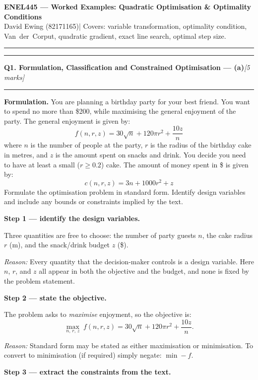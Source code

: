 \documentclass[10pt,a4paper]{article}
\newcommand{\sectitle}[2]{%
  \vspace{10pt}\noindent\rule{\linewidth}{0.8pt}\par\vspace{2pt}%
  {\large\textbf{#1}\hfill\normalsize\textit{[#2 marks]}}\par
  \vspace{2pt}\rule{\linewidth}{0.4pt}\vspace{4pt}}
\newcommand{\reason}[1]{%
  \begin{mdframed}[backgroundcolor=reasonbg, linewidth=0.4pt,
    innertopmargin=3pt, innerbottommargin=3pt,
    innerleftmargin=6pt, innerrightmargin=6pt]
    \small\textit{Reason:} \small #1
  \end{mdframed}\vspace{2pt}}
\begin{document}
\begin{center}
  {\large\textbf{ENEL445 --- Worked Examples: Quadratic Optimisation \& Optimality Conditions}}\\[3pt]
  {\small David Ewing (82171165)\quad|\quad
   Covers: variable transformation, optimality condition, Van~der~Corput,
   quadratic gradient, exact line search, optimal step size.}
\end{center}
\noindent\rule{\linewidth}{0.8pt}

\sectitle{Q1. Formulation, Classification and Constrained Optimisation --- (a)}{5}

\noindent\textbf{Formulation.}
You are planning a birthday party for your best friend. You want to spend
no more than \$200, while maximising the general enjoyment of the party.
The general enjoyment is given by:
\[
  f(n,r,z) = 30\sqrt{n} + 120\pi r^2 + \frac{10z}{n} \tag{1}
\]
where $n$ is the number of people at the party, $r$ is the radius of the
birthday cake in metres, and $z$ is the amount spent on snacks and drink.
You decide you need to have at least a small ($r\ge 0.2$) cake.
The amount of money spent in \$ is given by:
\[
  c(n,r,z) = 3n + 1000r^2 + z \tag{2}
\]
Formulate the optimisation problem in standard form. Identify design
variables and include any bounds or constraints implied by the text.

\vspace{6pt}
\textbf{Step 1 --- identify the design variables.}

Three quantities are free to choose: the number of party guests $n$, the
cake radius $r$ (m), and the snack/drink budget $z$ (\$).

\reason{Every quantity that the decision-maker controls is a design
        variable. Here $n$, $r$, and $z$ all appear in both the
        objective and the budget, and none is fixed by the problem
        statement.}

\textbf{Step 2 --- state the objective.}

The problem asks to \emph{maximise} enjoyment, so the objective is:
\[
  \max_{n,\,r,\,z}\; f(n,r,z) = 30\sqrt{n} + 120\pi r^2 + \frac{10z}{n}.
\]

\reason{Standard form may be stated as either maximisation or
        minimisation. To convert to minimisation (if required) simply
        negate: $\min -f$.}

\textbf{Step 3 --- extract the constraints from the text.}
\end{document}
